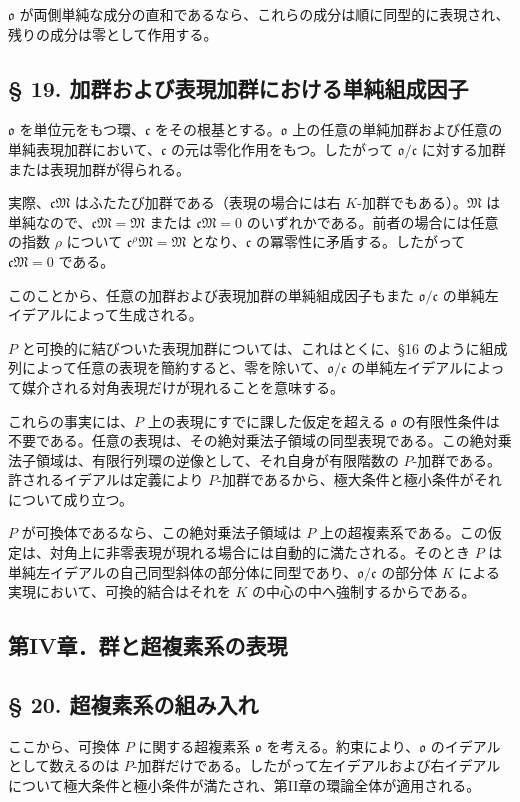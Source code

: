 \documentclass[11pt]{article}
\providecommand{\mM}{\mathfrak{M}}
\providecommand{\mo}{\mathfrak{o}}
\providecommand{\mc}{\mathfrak{c}}
\begin{document}
$\mo$ が両側単純な成分の直和であるなら、これらの成分は順に同型的に表現され、残りの成分は零として作用する。

\subsection*{§ 19. 加群および表現加群における単純組成因子}

$\mo$ を単位元をもつ環、$\mc$ をその根基とする。$\mo$ 上の任意の単純加群および任意の単純表現加群において、$\mc$ の元は零化作用をもつ。したがって $\mo/\mc$ に対する加群または表現加群が得られる。

実際、$\mc\mM$ はふたたび加群である（表現の場合には右 $K$-加群でもある）。$\mM$ は単純なので、$\mc\mM=\mM$ または $\mc\mM=0$ のいずれかである。前者の場合には任意の指数 $\rho$ について $\mc^\rho\mM=\mM$ となり、$\mc$ の冪零性に矛盾する。したがって $\mc\mM=0$ である。

このことから、任意の加群および表現加群の単純組成因子もまた $\mo/\mc$ の単純左イデアルによって生成される。

$P$ と可換的に結びついた表現加群については、これはとくに、§16 のように組成列によって任意の表現を簡約すると、零を除いて、$\mo/\mc$ の単純左イデアルによって媒介される対角表現だけが現れることを意味する。

これらの事実には、$P$ 上の表現にすでに課した仮定を超える $\mo$ の有限性条件は不要である。任意の表現は、その絶対乗法子領域の同型表現である。この絶対乗法子領域は、有限行列環の逆像として、それ自身が有限階数の $P$-加群である。許されるイデアルは定義により $P$-加群であるから、極大条件と極小条件がそれについて成り立つ。

$P$ が可換体であるなら、この絶対乗法子領域は $P$ 上の超複素系である。この仮定は、対角上に非零表現が現れる場合には自動的に満たされる。そのとき $P$ は単純左イデアルの自己同型斜体の部分体に同型であり、$\mo/\mc$ の部分体 $K$ による実現において、可換的結合はそれを $K$ の中心の中へ強制するからである。

\subsection*{第IV章．群と超複素系の表現}

\subsection*{§ 20. 超複素系の組み入れ}

ここから、可換体 $P$ に関する超複素系 $\mo$ を考える。約束により、$\mo$ のイデアルとして数えるのは $P$-加群だけである。したがって左イデアルおよび右イデアルについて極大条件と極小条件が満たされ、第II章の環論全体が適用される。
\end{document}
